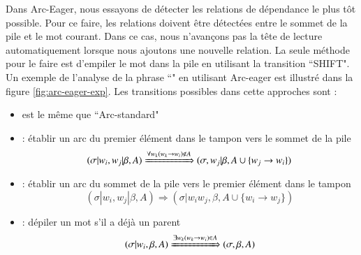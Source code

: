 \documentclass{KodeBook}
\begin{document}
Dans Arc-Eager, nous essayons de détecter les relations de dépendance le plus tôt possible. 
Pour ce faire, les relations doivent être détectées entre le sommet de la pile et le mot courant. 
Dans ce cas, nous n'avançons pas la tête de lecture automatiquement lorsque nous ajoutons une nouvelle relation. 
La seule méthode pour le faire est d'empiler le mot dans la pile en utilisant la transition ``SHIFT". 
Un exemple de l'analyse de la phrase ``" en utilisant Arc-eager est illustré dans la figure \ref{fig:arc-eager-exp}.
Les transitions possibles dans cette approches sont :
\begin{itemize}
	\item {} est le même que ``Arc-standard"
	
	\item {} : établir un arc du premier élément dans le tampon vers le sommet de la pile
	\[ (\sigma|w_i, w_j|\beta, A) \xRightarrow{\forall w_k (w_k \rightarrow w_i) \notin A}  (\sigma, w_j|\beta, A \cup \{w_j \rightarrow w_i \}) \] 
	
	\item {} : établir un arc du sommet de la pile vers le premier élément dans le tampon
	\[ (\sigma|w_i, w_j|\beta, A) \Rightarrow  (\sigma|w_i w_j, \beta, A \cup \{w_i \rightarrow w_j \}) \] 
	
	\item {} : dépiler un mot s'il a déjà un parent
	\[ (\sigma|w_i, \beta, A) \xRightarrow{\exists w_k (w_k \rightarrow w_i) \in A} (\sigma, \beta, A) \] 
\end{itemize}
\end{document}
